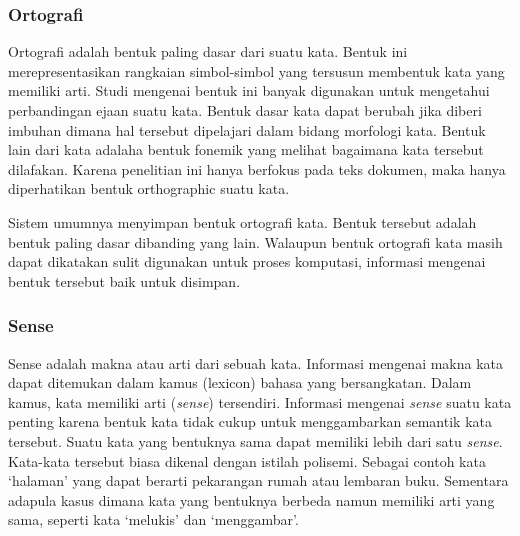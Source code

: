 \subsubsection{Ortografi}
Ortografi adalah bentuk paling dasar dari suatu kata. Bentuk ini merepresentasikan rangkaian simbol-simbol yang tersusun membentuk kata yang memiliki arti. Studi mengenai bentuk ini banyak digunakan untuk mengetahui perbandingan ejaan suatu kata. Bentuk dasar kata dapat berubah jika diberi imbuhan dimana hal tersebut dipelajari dalam bidang morfologi kata. Bentuk lain dari kata adalaha bentuk fonemik yang melihat bagaimana kata tersebut dilafakan. Karena penelitian ini hanya berfokus pada teks dokumen, maka hanya diperhatikan bentuk orthographic suatu kata.

Sistem umumnya menyimpan bentuk ortografi kata. Bentuk tersebut adalah bentuk paling dasar dibanding yang lain. Walaupun bentuk ortografi kata masih dapat dikatakan sulit digunakan untuk proses komputasi, informasi mengenai bentuk tersebut baik untuk disimpan.

\subsubsection{Sense}
Sense adalah makna atau arti dari sebuah kata. Informasi mengenai makna kata dapat ditemukan dalam kamus (lexicon) bahasa yang bersangkatan. Dalam kamus, kata memiliki arti (\textit{sense}) tersendiri. Informasi mengenai \textit{sense} suatu kata penting karena bentuk kata tidak cukup untuk menggambarkan semantik kata tersebut. Suatu kata yang bentuknya sama dapat memiliki lebih dari satu \textit{sense}. Kata-kata tersebut biasa dikenal dengan istilah polisemi. Sebagai contoh kata `halaman' yang dapat berarti pekarangan rumah atau lembaran buku. Sementara adapula kasus dimana kata yang bentuknya berbeda namun memiliki arti yang sama, seperti kata `melukis' dan `menggambar'.


